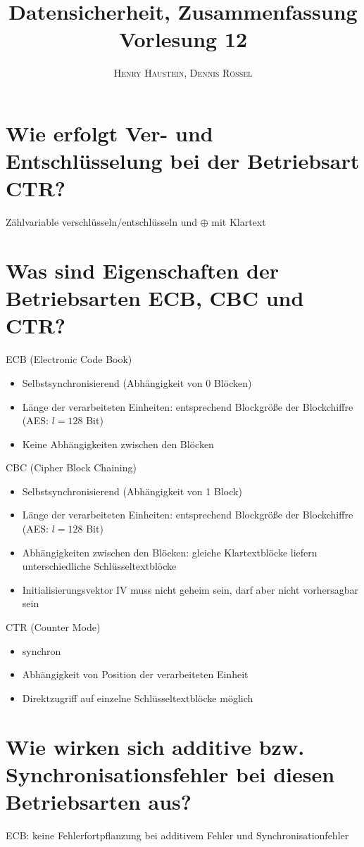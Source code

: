 \documentclass{article}
\title{\textbf{Datensicherheit, Zusammenfassung Vorlesung 12}}
\author{\textsc{Henry Haustein}, \textsc{Dennis Rössel}}
\date{}
\begin{document}
	\maketitle

	\section*{Wie erfolgt Ver- und Entschlüsselung bei der Betriebsart CTR?}
	Zählvariable verschlüsseln/entschlüsseln und $\oplus$ mit Klartext
	
	\section*{Was sind Eigenschaften der Betriebsarten ECB, CBC und CTR?}
	ECB (Electronic Code Book)
	\begin{itemize}
		\item Selbstsynchronisierend (Abhängigkeit von 0 Blöcken)
		\item Länge der verarbeiteten Einheiten: entsprechend Blockgröße der Blockchiffre (AES: $l = 128$ Bit)
		\item Keine Abhängigkeiten zwischen den Blöcken
	\end{itemize}
	
	CBC (Cipher Block Chaining)
	\begin{itemize}
		\item Selbstsynchronisierend (Abhängigkeit von 1 Block)
		\item Länge der verarbeiteten Einheiten: entsprechend Blockgröße der Blockchiffre (AES: $l = 128$ Bit)
		\item Abhängigkeiten zwischen den Blöcken: gleiche Klartextblöcke liefern unterschiedliche Schlüsseltextblöcke
		\item Initialisierungsvektor IV muss nicht geheim sein, darf aber nicht vorhersagbar sein
	\end{itemize}

	CTR (Counter Mode)
	\begin{itemize}
		\item synchron
		\item Abhängigkeit von Position der verarbeiteten Einheit
		\item Direktzugriff auf einzelne Schlüsseltextblöcke möglich
	\end{itemize}
	
	\section*{Wie wirken sich additive bzw. Synchronisationsfehler bei diesen Betriebsarten aus?}
	ECB: keine Fehlerfortpflanzung bei additivem Fehler und Synchronisationfehler
	
\end{document}
